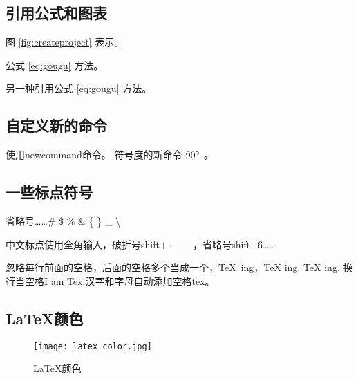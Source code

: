 \subsection{引用公式和图表}
图 \ref{fig:createproject} 表示。

公式 \ref{eq:gougu} 方法。

另一种引用公式 \eqref{eq:gougu} 方法。 %

\subsection{自定义新的命令}
使用newcommand命令。
符号度的新命令 $90^\circ$ 。%

\subsection{一些标点符号}
省略号\ldots \dots \# \quad \$ \quad \% \quad \& \quad \{ \quad \} \quad \_ \quad \textbackslash

中文标点使用全角输入，破折号shift+- ——，省略号shift+6……

忽略每行前面的空格，后面的空格多个当成一个，\TeX\ ing，\TeX{} ing. {\TeX} ing. 换行当空格I 
am Tex.汉字和字母自动添加空格tex。

\subsection{\LaTeX 颜色}
\begin{figure}[H]
\centering
\texttt{[image: latex\_color.jpg]}
\caption{\LaTeX 颜色}
\label{fig:latex color}
\end{figure}
